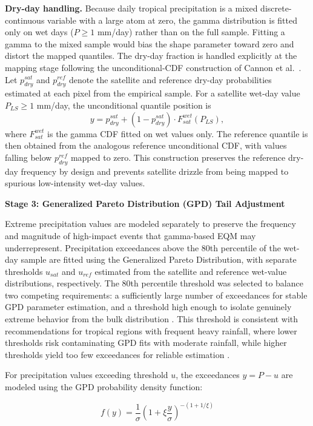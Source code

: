 \documentclass[remotesensing,article,submit,pdftex,moreauthors]{Definitions/mdpi}
\begin{document}
\textbf{Dry-day handling.} Because daily tropical precipitation is a
mixed discrete-continuous variable with a large atom at zero, the gamma
distribution is fitted only on wet days (\(P \geq 1\) mm/day) rather
than on the full sample. Fitting a gamma to the mixed sample would bias
the shape parameter toward zero and distort the mapped quantiles. The
dry-day fraction is handled explicitly at the mapping stage following
the unconditional-CDF construction of Cannon et al.~\cite{ref11}. Let
\(p_{dry}^{sat}\) and \(p_{dry}^{ref}\) denote the satellite and
reference dry-day probabilities estimated at each pixel from the
empirical sample. For a satellite wet-day value \(P_{LS} \geq 1\)
mm/day, the unconditional quantile position is
\[y = p_{dry}^{sat} + (1 - p_{dry}^{sat}) \cdot F_{sat}^{wet}(P_{LS}),\]
where \(F_{sat}^{wet}\) is the gamma CDF fitted on wet values only. The
reference quantile is then obtained from the analogous reference
unconditional CDF, with values falling below \(p_{dry}^{ref}\) mapped to
zero. This construction preserves the reference dry-day frequency by
design and prevents satellite drizzle from being mapped to spurious
low-intensity wet-day values.

\textbf{Stage 3: Generalized Pareto Distribution (GPD) Tail Adjustment}

Extreme precipitation values are modeled separately to preserve the
frequency and magnitude of high-impact events that gamma-based EQM may
underrepresent. Precipitation exceedances above the 80th percentile of
the wet-day sample are fitted using the Generalized Pareto Distribution,
with separate thresholds \(u_{sat}\) and \(u_{ref}\) estimated from the
satellite and reference wet-value distributions, respectively. The 80th
percentile threshold was selected to balance two competing requirements:
a sufficiently large number of exceedances for stable GPD parameter
estimation, and a threshold high enough to isolate genuinely extreme
behavior from the bulk distribution \cite{ref7}. This threshold is
consistent with recommendations for tropical regions with frequent heavy
rainfall, where lower thresholds risk contaminating GPD fits with
moderate rainfall, while higher thresholds yield too few exceedances for
reliable estimation \cite{ref25}.

For precipitation values exceeding threshold \(u\), the exceedances
\(y = P - u\) are modeled using the GPD probability density function:

\[f(y) = \frac{1}{\sigma} \left( 1 + \xi \frac{y}{\sigma} \right)^{-(1 + 1/\xi)}\]
\end{document}
